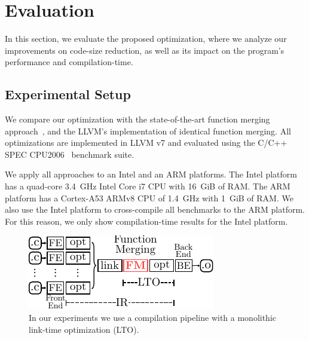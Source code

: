 \section{Evaluation}


In this section, we evaluate the proposed optimization, where we analyze our
improvements on code-size reduction, as well as its impact on the program's
performance and compilation-time.



\subsection{Experimental Setup}
We compare our optimization with the state-of-the-art function merging approach~\cite{edler14}, and the LLVM's implementation of identical
function merging. All optimizations are implemented in LLVM v7 and evaluated using the C/C++ SPEC CPU2006~\cite{spec} benchmark suite.

We apply all approaches to an Intel and an ARM platforms. The Intel platform has a quad-core 3.4~GHz Intel Core i7 CPU with 16~GiB of RAM.
The ARM platform has a Cortex-A53 ARMv8 CPU of 1.4~GHz with 1~GiB of RAM.
We also use the Intel platform to cross-compile all benchmarks to the ARM
platform.
For this reason, we only show compilation-time results for the Intel platform.

\begin{figure}[t!]
  \centering
  \includegraphics[width=0.7\linewidth]{figs/opt-pipeline.pdf}
  \caption{In our experiments we use a compilation pipeline with a monolithic link-time optimization (LTO).}
  \label{fig:opt-pipeline}
\end{figure}


